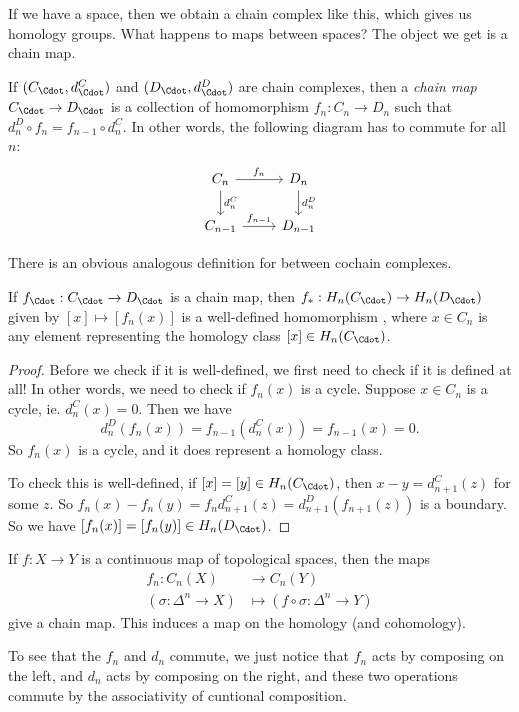 \documentclass[a4paper]{article}
\begin{document}
If we have a space, then we obtain a chain complex like this, which gives us homology groups. What happens to maps between spaces? The object we get is a chain map.

\begin{defi}
  If $(C_{\Cdot}, d_{\Cdot}^C)$ and $(D_{\Cdot}, d_{\Cdot}^D)$ are chain complexes, then a \emph{chain map} $C_{\Cdot} \to D_{\Cdot}$ is a collection of homomorphism $f_n: C_n \to D_n$ such that $d_n^D \circ f_n = f_{n - 1} \circ d_n^C$. In other words, the following diagram has to commute for all $n$:
  \[
    \begin{tikzcd}
      C_n \ar[r, "f_n"] \ar[d, "d_n^C"] & D_n \ar[d, "d_n^D"]\\
      C_{n - 1} \ar[r, "f_{n - 1}"] & D_{n - 1}
    \end{tikzcd}
  \]
\end{defi}
There is an obvious analogous definition for  between cochain complexes.

\begin{lemma}
  If $f_{\Cdot}: C_{\Cdot} \to D_{\Cdot}$ is a chain map, then $f_*: H_n(C_{\Cdot}) \to H_n(D_{\Cdot})$ given by $[x] \mapsto [f_n(x)]$ is a well-defined homomorphism , where $x \in C_n$ is any element representing the homology class $[x] \in H_n(C_{\Cdot})$.
\end{lemma}

\begin{proof}
  Before we check if it is well-defined, we first need to check if it is defined at all! In other words, we need to check if $f_n(x)$ is a cycle. Suppose $x \in C_n$ is a cycle, ie. $d_n^C(x) = 0$. Then we have
  \[
    d_n^D(f_n(x)) = f_{n - 1}(d_n^C(x)) = f_{n - 1}(x) = 0.
  \]
  So $f_n(x)$ is a cycle, and it does represent a homology class.

  To check this is well-defined, if $[x] = [y] \in H_n(C_{\Cdot})$, then $x - y = d_{n + 1}^C(z)$ for some $z$. So $f_n(x) - f_n(y) = f_n d_{n + 1}^C(z) = d_{n + 1}^D (f_{n + 1}(z))$ is a boundary. So we have $[f_n(x)] = [f_n(y)] \in H_n(D_{\Cdot})$.
\end{proof}

\begin{prop}
  If $f: X \to Y$ is a continuous map of topological spaces, then the maps
  \begin{align*}
    f_n: C_n(X) &\to C_n(Y)\\
    (\sigma: \Delta^n \to X) &\mapsto (f \circ \sigma: \Delta^n \to Y)
  \end{align*}
  give a chain map. This induces a map on the homology (and cohomology).
\end{prop}
To see that the $f_n$ and $d_n$ commute, we just notice that $f_n$ acts by composing on the left, and $d_n$ acts by composing on the right, and these two operations commute by the associativity of cuntional composition.
\end{document}
